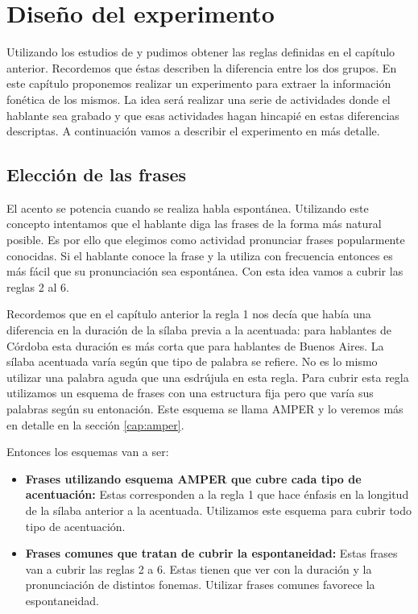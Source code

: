 \chapter{Diseño del experimento}

Utilizando los estudios de \cite{Fontanella2000} y  \cite{Vidal1964} pudimos obtener las reglas definidas en el capítulo anterior. Recordemos que éstas describen la diferencia entre los dos grupos. En este capítulo proponemos realizar un experimento para extraer la información fonética de los mismos. La idea será realizar una serie de actividades donde el hablante sea grabado y que esas actividades hagan hincapié en estas diferencias descriptas. A continuación vamos a describir el experimento en más detalle.

\section{Elección de las frases}

El acento se potencia cuando se realiza habla espontánea. Utilizando este concepto intentamos que el hablante diga las frases de la forma más natural posible. Es por ello que elegimos como actividad pronunciar frases popularmente conocidas. Si el hablante conoce la frase y la utiliza con frecuencia entonces es más fácil que su pronunciación sea espontánea. Con esta idea vamos a cubrir las reglas 2 al 6. 

Recordemos que en el capítulo anterior la regla 1 nos decía que había una diferencia en la duración de la sílaba previa a la acentuada: para hablantes de Córdoba esta duración es más corta que para hablantes de Buenos Aires. La sílaba acentuada varía según que tipo de palabra se refiere. No es lo mismo utilizar una palabra aguda que una esdrújula en esta regla. Para cubrir esta regla utilizamos un esquema de frases con una estructura fija pero que varía sus palabras según su entonación. Este esquema se llama AMPER \cite{amper2004,amper} y lo veremos más en detalle en la sección \ref{cap:amper}.

Entonces los esquemas van a ser: 

\begin{itemize}
  \item \textbf{Frases utilizando esquema AMPER que cubre cada tipo de acentuación:} Estas corresponden a la regla 1 que hace énfasis en la longitud de la sílaba anterior a la acentuada. Utilizamos este esquema para cubrir todo tipo de acentuación.
  \item \textbf{Frases comunes que tratan de cubrir la espontaneidad:} Estas frases van a cubrir las reglas 2 a 6. Estas tienen que ver con la duración y la pronunciación de distintos fonemas. Utilizar frases comunes favorece la espontaneidad.
\end{itemize}


